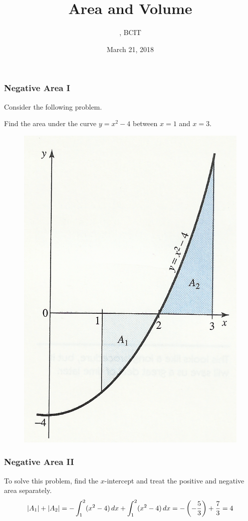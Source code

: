 \documentclass[xcolor=dvipsnames]{beamer}
\title{Area and Volume}
\subtitle{{\CourseNumber}, BCIT}
\author{\CourseName}
\date{March 21, 2018}
\begin{document}
\begin{frame}
  \titlepage
\end{frame}

\begin{frame}
  \frametitle{Negative Area I}
Consider the following problem.
\begin{block}{}
Find the area under the curve $y=x^{2}-4$ between $x=1$ and $x=3$.
\end{block}
\begin{figure}[h]
\includegraphics[scale=.6]{./diagrams/negarea.png}
\end{figure}
\end{frame}

\begin{frame}
  \frametitle{Negative Area II}
To solve this problem, find the $x$-intercept and treat the positive
and negative area separately. 
\begin{equation}
  \label{eq:aisohphu}
  \vert{}A_{1}\vert{}+\vert{}A_{2}\vert{}=-\int_{1}^{2}(x^{2}-4)\,dx+\int_{1}^{2}(x^{2}-4)\,dx=-\left(-\frac{5}{3}\right)+\frac{7}{3}=4\notag
\end{equation}
\end{frame}
\end{document}
